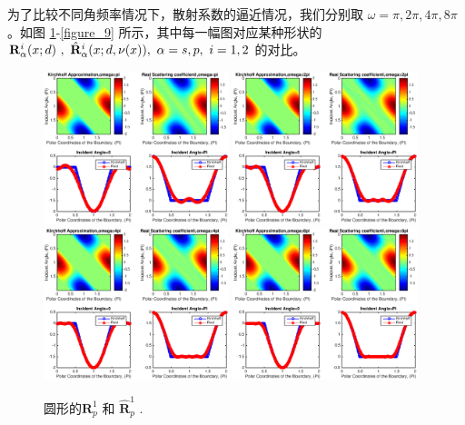 {为了比较不同角频率情况下，散射系数的逼近情况，我们分别取 $\omega= \pi,2\pi,4\pi,8\pi$。如图 \ref{figure_2}-\ref{figure_9} 所示，其中每一幅图对应某种形状的 $\mathbf{R}_\alpha^i(x;d) \ , \  \hat {\mathbf{R}}_\alpha^i(x;d,\nu(x)), \ \alpha=s,p,  \ i=1,2$ 的对比。
\begin{figure}[htbp]
	\centering
	\includegraphics[width=0.48\textwidth]{./Img/figure_sc_elastic/sc_p1_circle_1.eps}
	\includegraphics[width=0.48\textwidth]{./Img/figure_sc_elastic/sc_p1_circle_2.eps}
	\includegraphics[width=0.48\textwidth]{./Img/figure_sc_elastic/sc_p1_circle_4.eps}
	\includegraphics[width=0.48\textwidth]{./Img/figure_sc_elastic/sc_p1_circle_8.eps}		
	\caption{圆形的$\mathbf{R}_p^1$ 和 $\hat {\mathbf{R}}_p^1$ .}\label{figure_2}
\end{figure}

}
